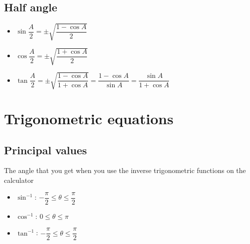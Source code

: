 \subsection{Half angle}
\begin{itemize}
    \item $\sin \dfrac{A}{2} = \pm \sqrt{\dfrac{1-\cos A}{2}}$
    \item $\cos \dfrac{A}{2} = \pm \sqrt{\dfrac{1+\cos A}{2}}$
    \item $\tan \dfrac{A}{2} = \pm \sqrt{\dfrac{1-\cos A}{1+\cos A}} = \dfrac{1-\cos A}{\sin A} = \dfrac{\sin A}{1+\cos A}$
\end{itemize}

\section{Trigonometric equations}
\subsection{Principal values}
The angle that you get when you use the inverse trigonometric functions on the calculator
\begin{itemize}
    \item $\sin^{-1}$: $-\dfrac{\pi}{2}\leq\theta\leq\dfrac{\pi}{2}$
    \item $\cos^{-1}$: $0\leq\theta\leq\pi$
    \item $\tan^{-1}$: $-\dfrac{\pi}{2}\leq\theta\leq\dfrac{\pi}{2}$
\end{itemize}